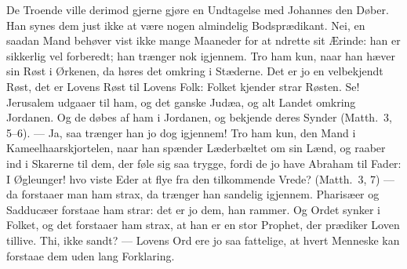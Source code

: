 \documentclass[12pt,a4paper]{book}
\begin{document}
De Troende ville derimod gjerne gjøre en Undtagelse med Johannes den Døber. Han
synes dem just ikke at være nogen almindelig Bodsprædikant. Nei, en saadan Mand
behøver vist ikke mange Maaneder for at ndrette sit Ærinde: han er sikkerlig vel
forberedt; han trænger nok igjennem. Tro ham kun, naar han hæver sin Røst i
Ørkenen, da høres det omkring i Stæderne. Det er jo en velbekjendt Røst, det er
Lovens Røst til Lovens Folk: Folket kjender strar Røsten. {\large Se! Jerusalem
udgaaer til ham, og det ganske Judæa, og alt Landet omkring Jordanen. Og de døbes
af ham i Jordanen, og bekjende deres Synder (Matth.\ 3, 5--6).} --- Ja, saa
trænger han jo dog igjennem! Tro ham kun, den Mand i Kameelhaarskjortelen, naar
han spænder Læderbæltet om sin Lænd, og raaber ind i Skarerne til dem, der føle
sig saa trygge, fordi de jo have Abraham til Fader: {\large I Øgleunger! hvo
viste Eder at flye fra den tilkommende Vrede? (Matth.\ 3, 7)} --- da forstaaer
man ham strax, da trænger han sandelig igjennem.
Pharisæer og Sadducæer forstaae ham strar: det er jo dem, han rammer. Og Ordet
synker i Folket, og det forstaaer ham strax, at han er en stor Prophet, der
prædiker Loven tillive. Thi, ikke sandt? --- Lovens Ord ere jo saa fattelige, at
hvert Menneske kan forstaae dem uden lang Forklaring.
\end{document}
